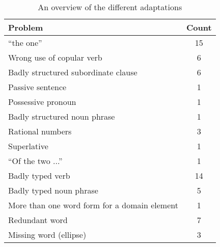 \begin{table}[h]
  \centering
  \begin{tabular}{lc}
    \hline
    \textbf{Problem} & \textbf{Count} \\ 
    \hline
    ``the one'' & 15 \\
    Wrong use of copular verb & 6 \\
    Badly structured subordinate clause & 6 \\
    Passive sentence & 1 \\
    Possessive pronoun & 1 \\
    Badly structured noun phrase & 1 \\
    \hline
    Rational numbers & 3 \\
    Superlative & 1 \\
    ``Of the two ...'' & 1 \\
    \hline
    Badly typed verb & 14 \\
    Badly typed noun phrase & 5 \\
    \hline
    More than one word form for a domain element  & 1 \\
    \hline
    Redundant word & 7 \\
    Missing word (ellipse) & 3 \\
    \hline
  \end{tabular}
  \caption{An overview of the different adaptations}
  \label{tbl:resultaten}
\end{table}
